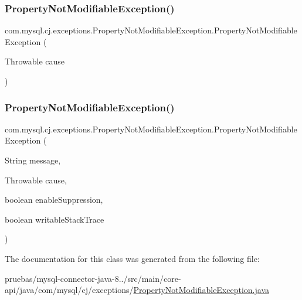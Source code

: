 \subsubsection{\texorpdfstring{Property\+Not\+Modifiable\+Exception()}{PropertyNotModifiableException()}\hspace{0.1cm}{\footnotesize\ttfamily [4/5]}}
{\footnotesize\ttfamily com.\+mysql.\+cj.\+exceptions.\+Property\+Not\+Modifiable\+Exception.\+Property\+Not\+Modifiable\+Exception (\begin{DoxyParamCaption}\item[{Throwable}]{cause }\end{DoxyParamCaption})}

\mbox{\label{classcom_1_1mysql_1_1cj_1_1exceptions_1_1_property_not_modifiable_exception_ae80af883e346fbe33c4eec879d50bf78}} 
\subsubsection{\texorpdfstring{Property\+Not\+Modifiable\+Exception()}{PropertyNotModifiableException()}\hspace{0.1cm}{\footnotesize\ttfamily [5/5]}}
{\footnotesize\ttfamily com.\+mysql.\+cj.\+exceptions.\+Property\+Not\+Modifiable\+Exception.\+Property\+Not\+Modifiable\+Exception (\begin{DoxyParamCaption}\item[{String}]{message,  }\item[{Throwable}]{cause,  }\item[{boolean}]{enable\+Suppression,  }\item[{boolean}]{writable\+Stack\+Trace }\end{DoxyParamCaption})\hspace{0.3cm}{\ttfamily [protected]}}



The documentation for this class was generated from the following file\+:\begin{DoxyCompactItemize}
\item 
pruebas/mysql-\/connector-\/java-\/8../src/main/core-\/api/java/com/mysql/cj/exceptions/\mbox{\hyperlink{_property_not_modifiable_exception_8java}{Property\+Not\+Modifiable\+Exception.\+java}}\end{DoxyCompactItemize}
